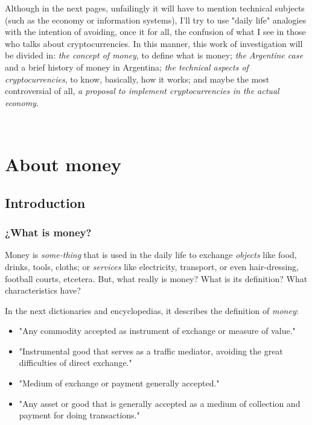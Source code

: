 \documentclass[12pt,a4paper,twoside]{book}
\begin{document}
Although in the next pages, unfailingly it will have to mention technical subjects (such as the economy or information systems), I'll try to use "daily life" analogies with the intention of avoiding, once it for all, the confusion of what I see in those who talks about cryptocurrencies. In this manner, this work of investigation will be divided in: \textit{the concept of money}, to define what is money; \textit{the Argentine case} and a brief history of money in Argentina; \textit{the technical aspects of cryptocurrencies}, to know, basically, how it works; and maybe the most controversial of all, \textit{a proposal to implement cryptocurrencies in the actual economy}.

\newpage

\setcounter{secnumdepth}{1}
\thispagestyle{empty}
\
\renewcommand{\thepage}{\arabic{page}}
\part{About money}
\chapter{Introduction}
\section{¿What is money?}
Money is \textit{some-thing} that is used in the daily life to exchange \textit{objects} like food, drinks, tools, cloths; or \textit{services} like electricity, transport, or even hair-dressing, football courts, etcetera. But, what really is money? What is its definition? What characteristics have?

In the next dictionaries and encyclopedias, it describes the definition of \textit{money}:

\begin{itemize}
\item "Any commodity accepted as instrument of exchange or measure of value." \cite[p. 3807]{dic:espasacalpe}
\item "Instrumental good that serves as a traffic mediator, avoiding the great difficulties of direct exchange." \cite{dic:clarin}
\item "Medium of exchange or payment generally accepted." \cite{rae}
\item "Any asset or good that is generally accepted as a medium of collection and payment for doing transactions." \cite{epedia:dinero}
\end{itemize}
\end{document}
